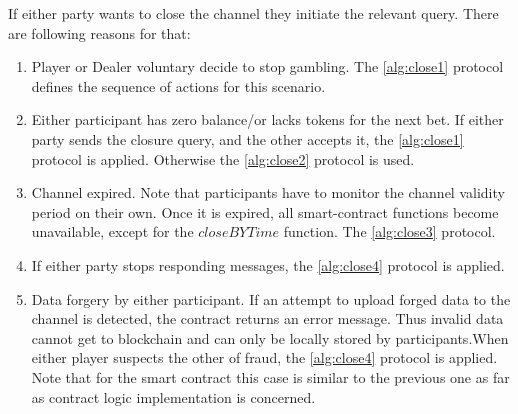 If either party wants to close the channel they initiate the relevant query. There are following reasons for that: \label{closing}
\begin{enumerate}
	\item Player or Dealer voluntary decide to stop gambling. The \autoref{alg:close1} protocol defines the sequence of actions for this scenario.
	\item Either participant has zero balance/or lacks tokens for the next bet. If either party sends the closure query, and the other accepts it, the \autoref{alg:close1} protocol is applied. Otherwise the \autoref{alg:close2} protocol is used.
	\item Channel expired. Note that participants have to monitor the channel validity period on their own. Once it is expired, all smart-contract functions become unavailable, except for the $closeBYTime$ function. The \autoref{alg:close3} protocol.
	\item If either party stops responding messages, the \autoref{alg:close4} protocol is applied.
	\item  Data forgery by either participant. If an attempt to upload forged data to the channel is detected, the contract returns an error message. Thus invalid data cannot get to blockchain and can only be locally stored by participants.When either player suspects the other of fraud, the \autoref{alg:close4} protocol is applied. Note that for the smart contract this case is similar to the previous one as far as contract logic implementation is concerned.
\end{enumerate}

